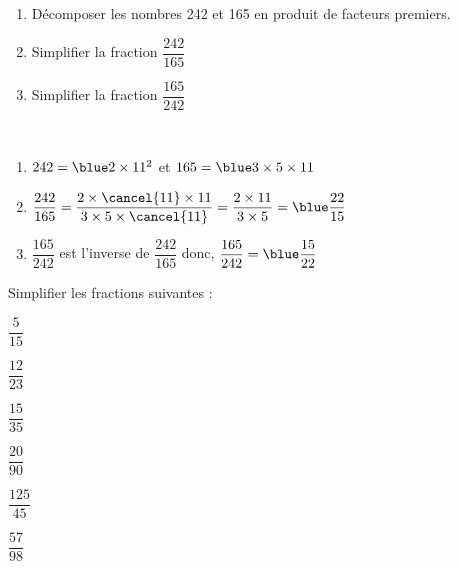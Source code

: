 \begin{colonne*exercice}
\begin{exercice}
   \begin{enumerate}
      \item Décomposer les nombres 242 et 165 en produit de facteurs premiers.
      \item Simplifier la fraction $\dfrac{242}{165}$ \medskip
      \item Simplifier la fraction $\dfrac{165}{242}$
   \end{enumerate}
\end{exercice}

\begin{corrige}
   \ \\ [-5mm]
   \begin{enumerate}
      \item $242 =\blue 2\times11^2$ et $165 =\blue3\times5\times11$ \medskip
      \item $\dfrac{242}{165} =\dfrac{2\times\cancel{11}\times11}{3\times5\times\cancel{11}} =\dfrac{2\times11}{3\times5} ={\blue \dfrac{22}{15}}$ \medskip
      \item $\dfrac{165}{242}$ est l'inverse de $\dfrac{242}{165}$ donc, $\dfrac{165}{242} ={\blue \dfrac{15}{22}}$
   \end{enumerate}
\end{corrige}

\bigskip


\begin{exercice}
   Simplifier les fractions suivantes : \smallskip
   \begin{colenumerate}{2}
      \item $\dfrac{5}{15}$ \bigskip
      \item $\dfrac{12}{23}$ \bigskip
      \item $\dfrac{15}{35}$ \smallskip
      \item $\dfrac{20}{90}$
      \item $\dfrac{125}{45}$
      \item $\dfrac{57}{98}$
   \end{colenumerate}
\end{exercice}


\end{colonne*exercice}
